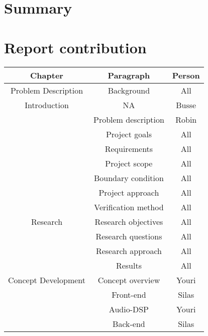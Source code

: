 \begin{justify}

\chapter*{Summary}


\newpage
\tableofcontents
\thispagestyle{empty}

\listoffigures
\thispagestyle{empty}

\listoftables
\thispagestyle{empty}

\newpage
\pagestyle{plain}

\chapter*{Report contribution}	%
\begin{longtable}{|c|c|c|}
	\hline
	\textbf{Chapter} & \textbf{Paragraph} & \textbf{Person} \\ \hline
	Problem Description			& Background					& All	 			\\ \hline
	Introduction				& NA							& Busse 			\\ \hline
								& Problem description			& Robin				\\ \hline
								& Project goals					& All				\\ \hline
								& Requirements					& All 				\\ \hline
								& Project scope					& All 				\\ \hline
								& Boundary condition			& All				\\ \hline
								& Project approach				& All				\\ \hline
								& Verification method			& All				\\ \hline
	Research 					& Research objectives			& All 				\\ \hline
								& Research questions			& All 				\\ \hline
								& Research approach				& All 				\\ \hline
								& Results						& All 				\\ \hline
	Concept Development 		& Concept overview				& Youri				\\ \hline
								& Front-end						& Silas				\\ \hline
								& Audio-DSP						& Youri				\\ \hline
								& Back-end						& Silas				\\ \hline

\end{longtable}
\end{justify}

